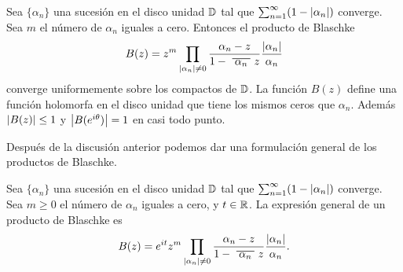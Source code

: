 \begin{corollary}
    Sea $\{\alpha_n\}$ una sucesión en el disco unidad $\mathbb{D}$ tal que $\sum_{n=1}^{\infty} (1 - \left\lvert\alpha_n\right\rvert)$ converge. Sea $m$ el número de $\alpha_n$ iguales a cero. Entonces el producto de Blaschke
\begin{equation*}
    B(z) = z^m \prod_{\abs{\alpha_n} \not = 0} \frac{\alpha_n - z}{1 - \xbar{\alpha_n}z} \dfrac{\abs{\alpha_n}}{\alpha_n}
\end{equation*}
converge uniformemente sobre los compactos de $\mathbb{D}$. La función $B(z)$ define una función holomorfa en el disco unidad que tiene los mismos ceros que $\alpha_n$. Además $\left\lvert B(z)\right\rvert \leq 1$ y $\left\lvert B(e^{i \theta})\right\rvert = 1$ en casi todo punto. \\
\end{corollary}

Después de la discusión anterior podemos dar una formulación general de los productos de Blaschke. \\

\begin{corollary}
    Sea $\{\alpha_n\}$ una sucesión en el disco unidad $\mathbb{D}$ tal que $\sum_{n=1}^{\infty} (1 - \left\lvert\alpha_n\right\rvert)$ converge. Sea $m \geq 0$ el número de $\alpha_n$ iguales a cero, y $t \in \mathbb{R}$. La expresión general de un producto de Blaschke es
    \begin{equation*}
        B(z) = e^{it}z^m \prod_{\abs{\alpha_n} \not = 0} \frac{\alpha_n - z}{1 - \xbar{\alpha_n}z} \dfrac{\abs{\alpha_n}}{\alpha_n}.
    \end{equation*}
\end{corollary}
